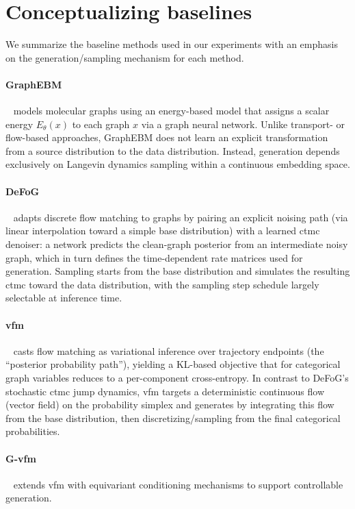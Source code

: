 \section{Conceptualizing baselines}
\label{app:baselines}

We summarize the baseline methods used in our experiments with an emphasis on the generation/sampling mechanism for each method. 

\paragraph{GraphEBM} ~\citep{liu2021graphebm} models molecular graphs using an energy-based model that assigns a scalar energy $E_\theta(x)$ to each graph $x$ via a graph neural network.
Unlike transport- or flow-based approaches, GraphEBM does not learn an explicit transformation from a source distribution to the data distribution. Instead, generation depends exclusively on Langevin dynamics sampling within a continuous embedding space.


\paragraph{DeFoG}~\citep{qinmadeira2024defog} adapts discrete flow matching to graphs by pairing an explicit noising path (via linear interpolation toward a simple base distribution) with a learned \gls{ctmc} denoiser: a network predicts the clean-graph posterior from an intermediate noisy graph, which in turn defines the time-dependent rate matrices used for generation.
Sampling starts from the base distribution and simulates the resulting \gls{ctmc} toward the data distribution, with the sampling step schedule largely selectable at inference time.

\paragraph{\gls{vfm}}~\citep{eijkelboom2024vfm} casts flow matching as variational inference over trajectory endpoints (the “posterior probability path”), yielding a KL-based objective that for categorical graph variables reduces to a per-component cross-entropy.
In contrast to DeFoG’s stochastic \gls{ctmc} jump dynamics, \gls{vfm} targets a deterministic continuous flow (vector field) on the probability simplex and generates by integrating this flow from the base distribution, then discretizing/sampling from the final categorical probabilities.


\paragraph{G-\gls{vfm}}~\citep{eijkelboom2025controlledvfm} extends \gls{vfm} with equivariant conditioning mechanisms to
support controllable generation.
